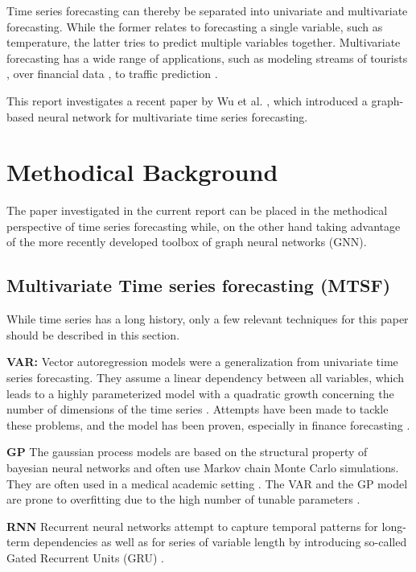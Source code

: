 \documentclass[letterpaper, twocolumn,11pt]{article}
\begin{document}
   Time series forecasting can thereby be separated into univariate and multivariate forecasting. While the former relates to forecasting a single variable, such as temperature, the latter tries to predict multiple variables together. Multivariate forecasting has a wide range of applications, such as modeling streams of tourists \cite{cankurt2016tourism},  over financial data \cite{torres2018applying}, to traffic prediction \cite{yin2016forecasting}.

This report investigates a recent paper by Wu et al. \cite{wu2020connecting}, which introduced a graph-based neural network for multivariate time series forecasting.

    \section{Methodical Background}
    The paper investigated in the current report can be placed in the methodical perspective of time series forecasting while, on the other hand taking advantage of the more recently developed toolbox of graph neural networks (GNN).

    \subsection{Multivariate Time series forecasting (MTSF)}
    While time series has a long history, only a few relevant techniques for this paper should be described in this section.

    \textbf{VAR:} Vector autoregression models were a generalization from univariate time series forecasting. They assume a linear dependency between all variables, which leads to a highly parameterized model with a quadratic growth concerning the number of dimensions of the time series \cite{lutkepohl2013vector}. Attempts have been made to tackle these problems, and the model has been proven, especially in finance forecasting \cite{lutkepohl2009econometric}.

    \textbf{GP} The gaussian process models are based on the structural property of bayesian neural networks and often use Markov chain Monte Carlo simulations. They are often used in a medical academic setting \cite{CHEN200759}. The VAR and the GP model are prone to overfitting due to the high number of tunable parameters \cite{wu2020connecting}.

    \textbf{RNN} Recurrent neural networks attempt to capture temporal patterns for long-term dependencies as well as for series of variable length by introducing so-called Gated Recurrent Units (GRU) \cite{che2018recurrent}.
\end{document}
